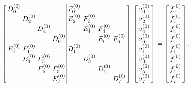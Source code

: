\documentclass[]{elsarticle}
\begin{document}
\begin{equation}
{\arraycolsep=1.4pt\def\arraystretch{1.2}
\begin{array}{cccc}
\left[\begin{array}{cccc|cccc}
D_0^{(0)} 	&     		&     		&     		& F_0^{(0)} &     		&     		&     \\
    		& D_2^{(0)} &     		&     		& E_2^{(0)} & F_2^{(0)} &     		&     \\
    		&     		& D_4^{(0)} &     		&     		& E_4^{(0)} & F_4^{(0)} &     \\
    		&     		&     		& D_6^{(0)} &     		&     		& E_6^{(0)} & F_6^{(0)} \\ \hline 
E_1^{(0)} 	& F_1^{(0)} &     		&     		& D_1^{(0)} &     		&     		&     \\
    		& E_3^{(0)} & F_3^{(0)} &     		&     		& D_3^{(0)} &     		&     \\
    		&     		& E_5^{(0)} & F_5^{(0)} &     		&     		& D_5^{(0)} &     \\
    		&     		&     		& E_7^{(0)} &     		&     		&     		& D_7^{(0)} \\
\end{array}\right]
&
\left[\begin{array}{c}
u_0^{(0)}\\
u_2^{(0)}\\
u_4^{(0)}\\
u_6^{(0)}\\\hline 
u_1^{(0)}\\
u_3^{(0)}\\
u_5^{(0)}\\
u_7^{(0)}\\
\end{array}\right]
&
=
&
\left[\begin{array}{c}
f_0^{(0)}\\
f_2^{(0)}\\
f_4^{(0)}\\
f_6^{(0)}\\\hline 
f_1^{(0)}\\
f_3^{(0)}\\
f_5^{(0)}\\
f_7^{(0)}\\
\end{array}\right]
\end{array}.
}
\label{permuted_system}
\end{equation}
\end{document}
